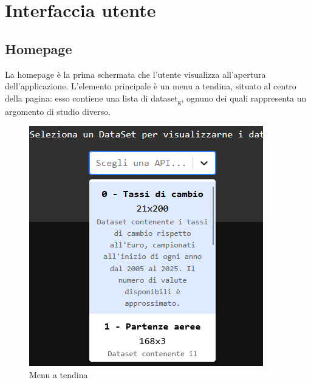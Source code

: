 \section{Interfaccia utente}

\subsection{Homepage}
La homepage è la prima schermata che l'utente visualizza all'apertura
dell'applicazione. L'elemento principale è un menu a tendina, situato al centro
della pagina: esso contiene una lista di dataset\textsubscript{g}, ognuno dei quali rappresenta
un argomento di studio diverso.
\begin{figure}[ht!]
    \centering
    \includegraphics[scale=0.5]{template/images/home/options.png}
    \caption{Menu a tendina}
\end{figure}

